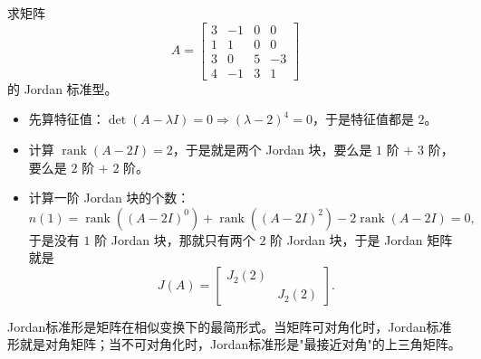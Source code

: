 \begin{example}
求矩阵\[
A = \begin{bmatrix}
3 & -1 & 0 & 0 \\
1 & 1 & 0 & 0 \\
3 & 0 & 5 & -3 \\
4 & -1 & 3 & 1
\end{bmatrix}
\]
的 Jordan 标准型。

\begin{itemize}
    \item 先算特征值：$\det(A - \lambda I) = 0 \Rightarrow (\lambda - 2)^4 = 0$，于是特征值都是 $2$。
    \item 计算 $\operatorname{rank}(A - 2I) = 2$，于是就是两个 Jordan 块，要么是 $1$ 阶 $+$ $3$ 阶，要么是 $2$ 阶 $+$ $2$ 阶。
    \item 计算一阶 Jordan 块的个数：
    \[
    n(1) = \operatorname{rank}\left((A-2I)^0\right) + \operatorname{rank}\left((A-2I)^2\right) - 2\operatorname{rank}(A-2I) = 0,
    \]
    于是没有 $1$ 阶 Jordan 块，那就只有两个 $2$ 阶 Jordan 块，于是 Jordan 矩阵就是
    \[
    J(A) = \begin{bmatrix}
    J_2(2) & \\
    & J_2(2)
    \end{bmatrix}.
    \]
\end{itemize}
\end{example}

Jordan标准形是矩阵在相似变换下的最简形式。当矩阵可对角化时，Jordan标准形就是对角矩阵；当不可对角化时，Jordan标准形是"最接近对角"的上三角矩阵。
